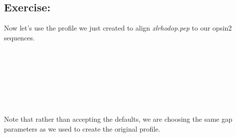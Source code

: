 \documentclass[12pt]{report}
\begin{document}
\subsection*{Exercise: }

Now let's use the profile we just created to align {\em xlrhodop.pep} to our opsin2 sequences.

\unix{}\\
\\
\\
\\
\\
\\

Note that rather than accepting the defaults, we are choosing the same
gap parameters as we used to create the original profile.
\end{document}
